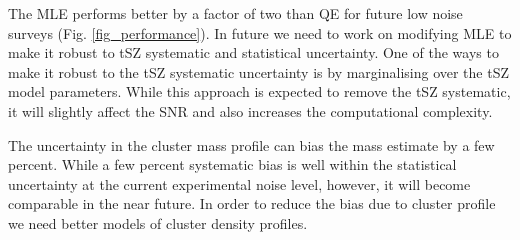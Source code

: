 The MLE performs better by a factor of two than QE for future low noise surveys (Fig. \ref{fig_performance}). 
In future we need to work on modifying MLE to make it robust to tSZ systematic and statistical uncertainty. 
One of the ways to make it robust to the tSZ systematic uncertainty is by marginalising over the tSZ model parameters. 	
While this approach is expected to remove the tSZ systematic, it will slightly affect the SNR and also increases the computational complexity. 

The uncertainty in the cluster mass profile can bias the mass estimate by a few percent. 
While a few percent systematic bias is well within the statistical uncertainty at the current experimental noise level, however, it will become comparable in the near future. 
In order to reduce the bias due to cluster profile we need better models of cluster density profiles.








